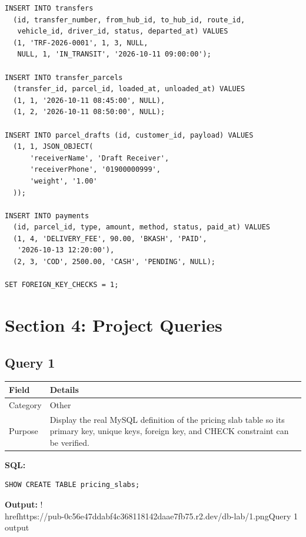 \documentclass[11pt,a4paper]{article}
\begin{document}
\begin{lstlisting}
INSERT INTO transfers
  (id, transfer_number, from_hub_id, to_hub_id, route_id,
   vehicle_id, driver_id, status, departed_at) VALUES
  (1, 'TRF-2026-0001', 1, 3, NULL,
   NULL, 1, 'IN_TRANSIT', '2026-10-11 09:00:00');

INSERT INTO transfer_parcels
  (transfer_id, parcel_id, loaded_at, unloaded_at) VALUES
  (1, 1, '2026-10-11 08:45:00', NULL),
  (1, 2, '2026-10-11 08:50:00', NULL);

INSERT INTO parcel_drafts (id, customer_id, payload) VALUES
  (1, 1, JSON_OBJECT(
      'receiverName', 'Draft Receiver',
      'receiverPhone', '01900000999',
      'weight', '1.00'
  ));

INSERT INTO payments
  (id, parcel_id, type, amount, method, status, paid_at) VALUES
  (1, 4, 'DELIVERY_FEE', 90.00, 'BKASH', 'PAID',
   '2026-10-13 12:20:00'),
  (2, 3, 'COD', 2500.00, 'CASH', 'PENDING', NULL);

SET FOREIGN_KEY_CHECKS = 1;
\end{lstlisting}
\section{Section 4: Project Queries}
\subsection{Query 1}
\begin{tabularx}{\linewidth}{>{\raggedright\arraybackslash}X|>{\raggedright\arraybackslash}X}
\hline
\textbf{Field} & \textbf{Details} \\ 
\hline
Category & Other \\ 
\hline
Purpose & Display the real MySQL definition of the pricing slab table so its primary key, unique keys, foreign key, and CHECK constraint can be verified. \\ 
\hline
\end{tabularx}
\textbf{SQL:}
\begin{lstlisting}
SHOW CREATE TABLE pricing_slabs;
\end{lstlisting}
\textbf{Output:}
!\\href{https://pub-0c56e47ddabf4c368118142daae7fb75.r2.dev/db-lab/1.png}{Query 1 output}
\end{document}
